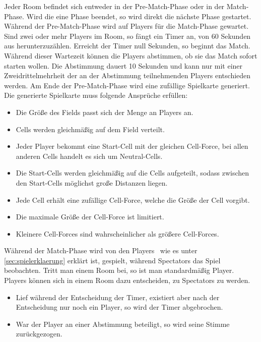 \begin{description}
		Jeder Room befindet sich entweder in der Pre-Match-Phase oder in der Match-Phase. Wird die eine Phase beendet, so wird direkt die nächste Phase gestartet.
		Während der Pre-Match-Phase wird auf Players für die Match-Phase gewartet. 
		Sind zwei oder mehr Players im Room, so fängt ein Timer an, von 60 Sekunden aus herunterzuzählen. Erreicht der Timer null Sekunden, so beginnt das Match. Während dieser Wartezeit können die Players abstimmen, ob sie das Match sofort starten wollen. Die Abstimmung dauert 10 Sekunden und kann nur mit einer Zweidrittelmehrheit der an der Abstimmung teilnehmenden Players entschieden werden.
		Am Ende der Pre-Match-Phase wird eine zufällige Spielkarte generiert. \\
		Die generierte Spielkarte muss folgende Ansprüche erfüllen:
		\begin{itemize}
			\item Die Größe des Fields passt sich der Menge an Players an.
			\item Cells werden gleichmäßig auf dem Field verteilt.
			\item Jeder Player bekommt eine Start-Cell mit der gleichen Cell-Force, bei allen anderen Cells handelt es sich um Neutral-Cells.
			\item Die Start-Cells werden gleichmäßig auf die Cells aufgeteilt, sodass zwischen den Start-Cells möglichst große Distanzen liegen.
			\item Jede Cell erhält eine zufällige Cell-Force, welche die Größe der Cell vorgibt.
			\item Die maximale Größe der Cell-Force ist limitiert.
			\item Kleinere Cell-Forces sind wahrscheinlicher als größere Cell-Forces.
		\end{itemize}
		Während der Match-Phase wird von den Players \vires\, wie es unter \ref{sec:spielerklaerung} erklärt ist, gespielt, während Spectators das Spiel beobachten.
		Tritt man einem Room bei, so ist man standardmäßig Player. Players können sich in einem Room dazu entscheiden, zu Spectators zu werden.
		\begin{itemize}
			\item Lief während der Entscheidung der Timer, existiert aber nach der Entscheidung nur noch ein Player, so wird der Timer abgebrochen.
			\item War der Player an einer Abstimmung beteiligt, so wird seine Stimme zurückgezogen. 

\end{itemize}
\end{description}
